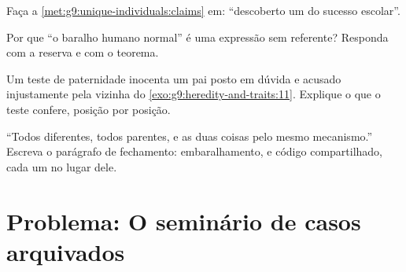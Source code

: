 \begin{exercise}[$\star\star$]\label{exo:g9:unique-individuals:9}
Faça a \cref{met:g9:unique-individuals:claims} em:
``descoberto um  do sucesso escolar''.
\end{exercise}

\begin{exercise}[$\star\star$]\label{exo:g9:unique-individuals:10}
Por que ``o baralho humano normal'' é uma expressão sem
referente? Responda com a reserva e com o teorema.
\end{exercise}

\begin{exercise}[$\star\star$]\label{exo:g9:unique-individuals:11}
Um teste de paternidade inocenta um pai posto em dúvida e
acusado injustamente pela vizinha do
\cref{exo:g9:heredity-and-traits:11}. Explique o que o teste
confere, posição por posição.
\end{exercise}

\begin{exercise}[$\star\star\star$]\label{exo:g9:unique-individuals:12}
``Todos diferentes, todos parentes, e as duas coisas pelo
mesmo mecanismo.'' Escreva o parágrafo de fechamento:
embaralhamento,  e código compartilhado, cada um no
lugar dele.
\end{exercise}

\section{Problema: O seminário de casos arquivados}

